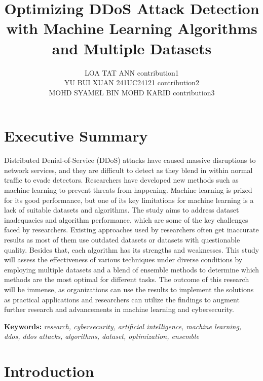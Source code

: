 \documentclass[a4paper, 12pt]{article}
\author{
LOA TAT ANN \quad 1221304731 \quad contribution1 \\
YU BUI XUAN \quad 241UC24121 \quad contribution2\\
MOHD SYAMEL BIN MOHD KARID \quad 1221309130 \quad contribution3\\
}
\title{ Optimizing DDoS Attack Detection with Machine Learning Algorithms and Multiple Datasets }
\begin{document}
\maketitle


\section*{Executive Summary}

Distributed Denial-of-Service (DDoS) attacks have caused massive disruptions to network services, and they are difficult to detect as they blend in within normal traffic to evade detectors. Researchers have developed new methods such as machine learning to prevent threats from happening. Machine learning is prized for its good performance, but one of its key limitations for machine learning is a lack of suitable datasets and algorithms. The study aims to address dataset inadequacies and algorithm performance, which are some of the key challenges faced by researchers. Existing approaches used by researchers often get inaccurate results as most of them use outdated datasets or datasets with questionable quality. Besides that, each algorithm has its strengths and weaknesses. This study will assess the effectiveness of various techniques under diverse conditions by employing multiple datasets and a blend of ensemble methods to determine which methods are the most optimal for different tasks. The outcome of this research will be immense, as organizations can use the results to implement the solutions as practical applications and researchers can utilize the findings to augment further research and advancements in machine learning and cybersecurity. 

\textbf{Keywords:} \textit{research, cybersecurity, artificial intelligence, machine learning, ddos, ddos attacks, algorithms, dataset, optimization, ensemble}

\section{Introduction}
\end{document}
